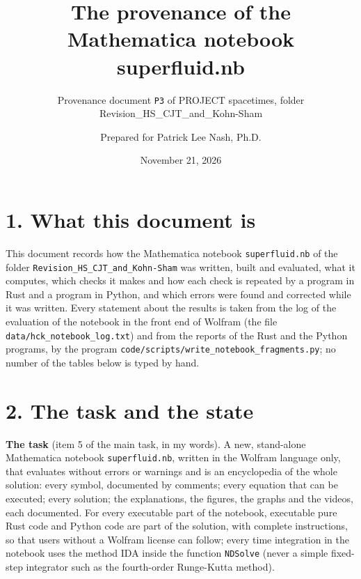 \documentclass[
  10pt,
]{article}
\title{The provenance of the Mathematica notebook superfluid.nb}
\subtitle{Provenance document \texttt{P3} of PROJECT spacetimes, folder
Revision\_HS\_CJT\_and\_Kohn-Sham}
\author{Prepared for Patrick Lee Nash, Ph.D.}
\date{November 21, 2026}
\begin{document}
\maketitle

\hypertarget{what-this-document-is}{%
\section{1. What this document is}\label{what-this-document-is}}

This document records how the Mathematica notebook
\texttt{superfluid.nb} of the folder
\texttt{Revision\_HS\_CJT\_and\_Kohn-Sham} was written, built and
evaluated, what it computes, which checks it makes and how each check is
repeated by a program in Rust and a program in Python, and which errors
were found and corrected while it was written. Every statement about the
results is taken from the log of the evaluation of the notebook in the
front end of Wolfram (the file \texttt{data/hck\_notebook\_log.txt}) and
from the reports of the Rust and the Python programs, by the program
\texttt{code/scripts/write\_notebook\_fragments.py}; no number of the
tables below is typed by hand.

\hypertarget{the-task-and-the-state}{%
\section{2. The task and the state}\label{the-task-and-the-state}}

\textbf{The task} (item 5 of the main task, in my words). A new,
stand-alone Mathematica notebook \texttt{superfluid.nb}, written in the
Wolfram language only, that evaluates without errors or warnings and is
an encyclopedia of the whole solution: every symbol, documented by
comments; every equation that can be executed; every solution; the
explanations, the figures, the graphs and the videos, each documented.
For every executable part of the notebook, executable pure Rust code and
Python code are part of the solution, with complete instructions, so
that users without a Wolfram license can follow; every time integration
in the notebook uses the method IDA inside the function \texttt{NDSolve}
(never a simple fixed-step integrator such as the fourth-order
Runge-Kutta method).
\end{document}
